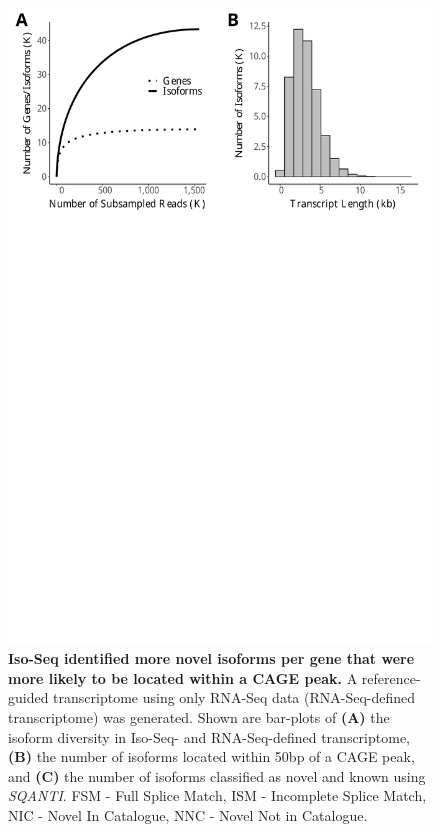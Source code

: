 \begin{figure}[htp]
	\begin{center}
		\includegraphics[page=9,trim={0 13cm 0 0},scale = 0.55]{Figures/IsoSeqWholeTranscriptome.pdf}
	\end{center}
	\captionsetup{width=0.95\textwidth}
	\caption[Comparison of Iso-Seq-defined and RNA-Seq-defined transcriptome]%
	{\textbf{Iso-Seq identified more novel isoforms per gene that were more likely to be located within a CAGE peak.} A reference-guided transcriptome using only RNA-Seq data (RNA-Seq-defined transcriptome) was generated. Shown are bar-plots of \textbf{(A)} the isoform diversity in Iso-Seq- and RNA-Seq-defined transcriptome, \textbf{(B)} the number of isoforms located within 50bp of a CAGE peak, and \textbf{(C)} the number of isoforms classified as novel and known using \textit{SQANTI}. FSM - Full Splice Match, ISM - Incomplete Splice Match, NIC - Novel In Catalogue, NNC - Novel Not in Catalogue.}   
	\label{fig:isoseq_whole_rnaseqvsisoseq}
\end{figure}

